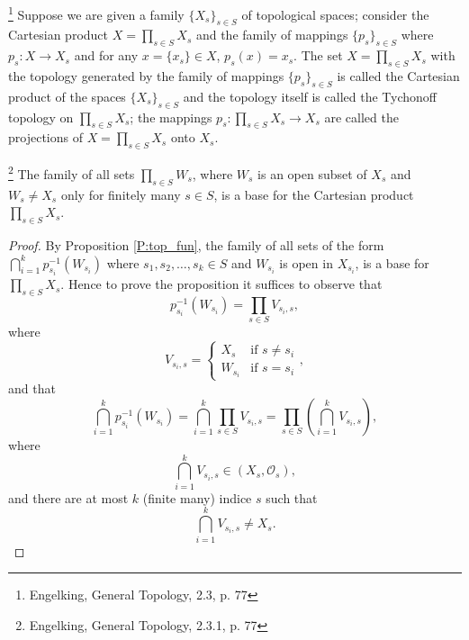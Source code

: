 \begin{definition}
\footnote{Engelking, General Topology, 2.3, p. 77}
 
Suppose we are given a family $\{X_s\}_{s\in S}$ of topological spaces; 
consider the Cartesian product $X=\prod_{s\in S} X_s$ and the family of 
mappings $\{p_s\}_{s\in S}$ where $p_s:X\to X_s$ and for any 
$x=\{x_s\}\in X$, $p_s(x)=x_s$. The set $X=\prod_{s\in S} X_s$ with the
topology generated by the family of mappings $\{p_s\}_{s\in S}$ is called
the Cartesian product of the spaces $\{X_s\}_{s\in S}$ and the topology 
itself is called the Tychonoff topology on $\prod_{s\in S} X_s$; the 
mappings $p_s:\prod_{s\in S}X_s \to X_s$ are called the projections of
$X=\prod_{s\in S} X_s$ onto $X_s$.
\end{definition}

\begin{proposition} \label{P:prod_base}
\footnote{Engelking, General Topology, 2.3.1, p. 77}
The family of all sets $\prod_{s\in S} W_s$, where $W_s$ is an open subset of 
$X_s$ and $W_s\neq X_s$ only for finitely many $s\in S$, is a base for the
Cartesian product $\prod_{s\in S} X_s$.
\end{proposition}
\begin{proof}
By Proposition \ref{P:top_fun}, the family of all sets of the form 
$\bigcap_{i=1}^k p^{-1}_{s_i}(W_{s_i})$ where $s_1,s_2,\dots,s_k\in S$ and
$W_{s_i}$ is open in $X_{s_i}$, is a base for $\prod_{s\in S} X_s$. Hence 
to prove the proposition it suffices to observe that
\[
  p^{-1}_{s_i}(W_{s_i}) = \prod_{s\in S} V_{s_i,s}, 
\]
where
\[
  V_{s_i,s}=
    \begin{cases} 
      X_s     & \text{if $s\neq s_i$}    \\
      W_{s_i} & \text{if $s=s_i$}
    \end{cases},
\]
and that
\[
  \bigcap_{i=1}^k p^{-1}_{s_i}(W_{s_i})
    = \bigcap_{i=1}^k \prod_{s\in S} V_{s_i,s}
    = \prod_{s\in S} \left( \bigcap_{i=1}^k V_{s_i,s} \right),
\]
where
\[
  \bigcap_{i=1}^k V_{s_i,s} \in (X_s,\mathcal{O}_s),
\]
and there are at most $k$ (finite many) indice $s$ such that
\[
  \bigcap_{i=1}^k V_{s_i,s} \neq X_s.
\]
\end{proof}

